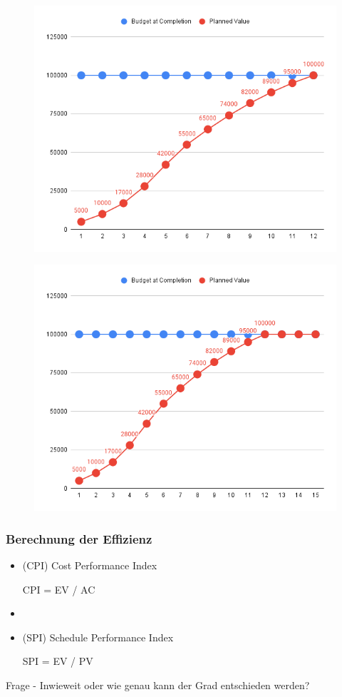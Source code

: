 \documentclass{f4_beamer}
\begin{document}
\begin{frame}
    \begin{figure}[htp]
        \centering
        \includegraphics[width=.75\textwidth, keepaspectratio]{img/chart1.png}
    \end{figure}
\end{frame}
\begin{frame}
    \begin{figure}[htp]
        \centering
        \includegraphics[width=.75\textwidth, keepaspectratio]{img/chart2.png}
    \end{figure}
\end{frame}
\begin{frame}[fragile]
    \frametitle{Berechnung der Effizienz}
    \LARGE
    \begin{itemize}
        \item (CPI) Cost Performance Index
        \begin{center}
            CPI = EV / AC
        \end{center}
        \item[]
        \item (SPI) Schedule Performance Index
        \begin{center}
            SPI = EV / PV
        \end{center}
    \end{itemize}
\end{frame}
\begin{frame}[fragile]
    \huge
    Frage - Inwieweit oder wie genau kann der Grad entschieden werden?
\end{frame}
\end{document}
